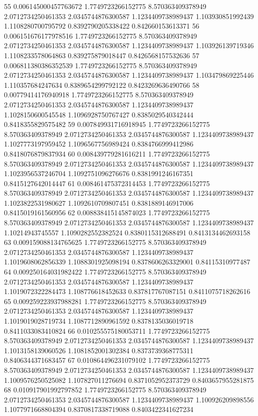 {55 0.006145000457763672 1.7749723266152775 8.570363409378949 2.0712734250461353 2.0345744876300587 1.1234409738989437 1.103930851992439 1.1108280700795792 0.8392790205338422 0.842660153613371
56 0.006151676177978516 1.7749723266152775 8.570363409378949 2.0712734250461353 2.0345744876300587 1.1234409738989437 1.103926139719346 1.1108233578064863 0.839275879018447 0.8426568157532636
57 0.006811380386352539 1.7749723266152775 8.570363409378949 2.0712734250461353 2.0345744876300587 1.1234409738989437 1.103479869225446 1.110357684247634 0.8389654299792122 0.8423269636490766
58 0.00779414176940918 1.7749723266152775 8.570363409378949 2.0712734250461353 2.0345744876300587 1.1234409738989437 1.1028150600545548 1.1096928750767427 0.8385029540342444 0.8418355829575482
59 0.007849931716918945 1.7749723266152775 8.570363409378949 2.0712734250461353 2.0345744876300587 1.1234409738989437 1.1027773197959452 1.1096567756989424 0.8384766999412986 0.8418076879837934
60 0.008439779281616211 1.7749723266152775 8.570363409378949 2.0712734250461353 2.0345744876300587 1.1234409738989437 1.1023956537246704 1.1092751096276676 0.8381991246167351 0.8415127642014447
61 0.008461475372314453 1.7749723266152775 8.570363409378949 2.0712734250461353 2.0345744876300587 1.1234409738989437 1.1023822531980627 1.1092610709807451 0.8381889146917006 0.8415019161560956
62 0.008838415145874023 1.7749723266152775 8.570363409378949 2.0712734250461353 2.0345744876300587 1.1234409738989437 1.10214943745557 1.1090282552382524 0.8380115312688491 0.8413134462693158
63 0.009159088134765625 1.7749723266152775 8.570363409378949 2.0712734250461353 2.0345744876300587 1.1234409738989437 1.1019608062856339 1.1088301925098194 0.8378606263329001 0.84115310977487
64 0.009250164031982422 1.7749723266152775 8.570363409378949 2.0712734250461353 2.0345744876300587 1.1234409738989437 1.1019072322284473 1.108776618452633 0.837817767087151 0.8411075718262616
65 0.009259223937988281 1.7749723266152775 8.570363409378949 2.0712734250461353 2.0345744876300587 1.1234409738989437 1.1019019028719734 1.1087712890961592 0.8378135036019718 0.8411033083410824
66 0.010255575180053711 1.7749723266152775 8.570363409378949 2.0712734250461353 2.0345744876300587 1.1234409738989437 1.1013158139060526 1.1081852001302384 0.8373739368775311 0.8406344371683457
67 0.010864496231079102 1.7749723266152775 8.570363409378949 2.0712734250461353 2.0345744876300587 1.1234409738989437 1.1009576250525082 1.107827011276694 0.8371052952373729 0.8403657955281875
68 0.010917901992797852 1.7749723266152775 8.570363409378949 2.0712734250461353 2.0345744876300587 1.1234409738989437 1.100926209898556 1.1077971668804394 0.8370817338719088 0.8403422341627234
}
